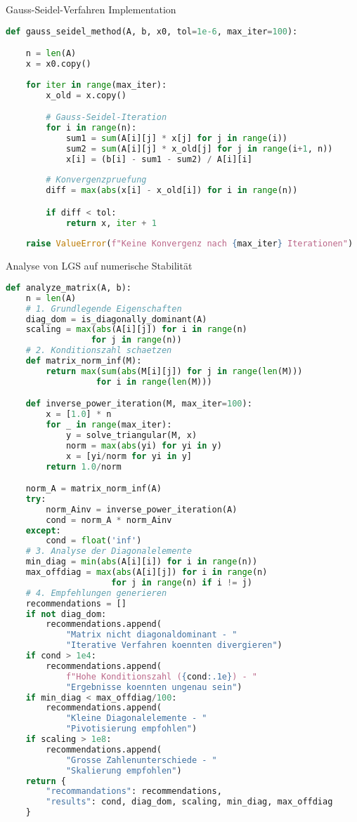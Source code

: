\begin{examplecode}{Gauss-Seidel-Verfahren Implementation}
\begin{lstlisting}[language=Python, style=basesmol]
def gauss_seidel_method(A, b, x0, tol=1e-6, max_iter=100):

    n = len(A)
    x = x0.copy()
    
    for iter in range(max_iter):
        x_old = x.copy()

        # Gauss-Seidel-Iteration
        for i in range(n):
            sum1 = sum(A[i][j] * x[j] for j in range(i))
            sum2 = sum(A[i][j] * x_old[j] for j in range(i+1, n))
            x[i] = (b[i] - sum1 - sum2) / A[i][i]
            
        # Konvergenzpruefung
        diff = max(abs(x[i] - x_old[i]) for i in range(n))

        if diff < tol:
            return x, iter + 1
            
    raise ValueError(f"Keine Konvergenz nach {max_iter} Iterationen")
\end{lstlisting}
\end{examplecode}

\begin{examplecode}{Analyse von LGS auf numerische Stabilität}
\begin{lstlisting}[language=Python, style=basesmol]
def analyze_matrix(A, b):
    n = len(A)
    # 1. Grundlegende Eigenschaften
    diag_dom = is_diagonally_dominant(A)
    scaling = max(abs(A[i][j]) for i in range(n) 
                 for j in range(n))
    # 2. Konditionszahl schaetzen 
    def matrix_norm_inf(M):
        return max(sum(abs(M[i][j]) for j in range(len(M))) 
                  for i in range(len(M)))

    def inverse_power_iteration(M, max_iter=100):
        x = [1.0] * n
        for _ in range(max_iter):
            y = solve_triangular(M, x)
            norm = max(abs(yi) for yi in y)
            x = [yi/norm for yi in y]
        return 1.0/norm

    norm_A = matrix_norm_inf(A)
    try:
        norm_Ainv = inverse_power_iteration(A)
        cond = norm_A * norm_Ainv
    except:
        cond = float('inf')
    # 3. Analyse der Diagonalelemente
    min_diag = min(abs(A[i][i]) for i in range(n))
    max_offdiag = max(abs(A[i][j]) for i in range(n) 
                     for j in range(n) if i != j)
    # 4. Empfehlungen generieren
    recommendations = []
    if not diag_dom:
        recommendations.append(
            "Matrix nicht diagonaldominant - "
            "Iterative Verfahren koennten divergieren")
    if cond > 1e4:
        recommendations.append(
            f"Hohe Konditionszahl ({cond:.1e}) - "
            "Ergebnisse koennten ungenau sein")
    if min_diag < max_offdiag/100:
        recommendations.append(
            "Kleine Diagonalelemente - "
            "Pivotisierung empfohlen")
    if scaling > 1e8:
        recommendations.append(
            "Grosse Zahlenunterschiede - "
            "Skalierung empfohlen")
    return {
        "recommandations": recommendations, 
        "results": cond, diag_dom, scaling, min_diag, max_offdiag
    }
\end{lstlisting}
\end{examplecode}

